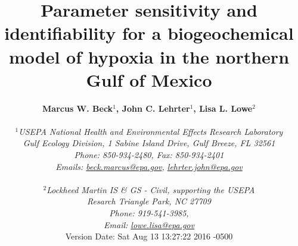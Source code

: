 \documentclass[letterpaper,12pt,oneside]{article}\usepackage[]{graphicx}\usepackage[]{color}
\begin{document}
\raggedbottom
\linenumbers
\raggedright
{}
\setlength{\parindent}{0.5in}
\renewcommand\refname{References \vspace{12pt}}

\begin{singlespace}
\title{{\bf {\Large Parameter sensitivity and identifiability for a biogeochemical model of hypoxia in the northern {G}ulf of {M}exico}}}
\author{
  {\bf {\normalsize Marcus W. Beck$^1$, John C. Lehrter$^1$, Lisa L. Lowe$^2$}}
  \\\\{\textit {\normalsize $^1$USEPA National Health and Environmental Effects Research Laboratory}}
  \\{\textit {\normalsize Gulf Ecology Division, 1 Sabine Island Drive, Gulf Breeze, FL 32561}}
	\\{\textit {\normalsize Phone: 850-934-2480, Fax: 850-934-2401}}
	\\{\textit {\normalsize Emails: \href{mailto:beck.marcus@epa.gov}{beck.marcus@epa.gov}, \href{mailto:lehrter.john@epa.gov}{lehrter.john@epa.gov}}}
	\\\\{\textit {\normalsize $^2$Lockheed Martin IS \& GS - Civil, supporting the USEPA}}
	\\{\textit {\normalsize Resarch Triangle Park, NC 27709}}
	\\{\textit {\normalsize Phone: 919-541-3985,}}
	\\{\textit {\normalsize Email: \href{mailto:lowe.lisa@epa.gov}{lowe.lisa@epa.gov}}}
  \vspace{1in} 
  \\ Version Date:   Sat Aug 13 13:27:22 2016 -0500
	}
\date{}
\maketitle
\end{singlespace}
\clearpage
\end{document}
